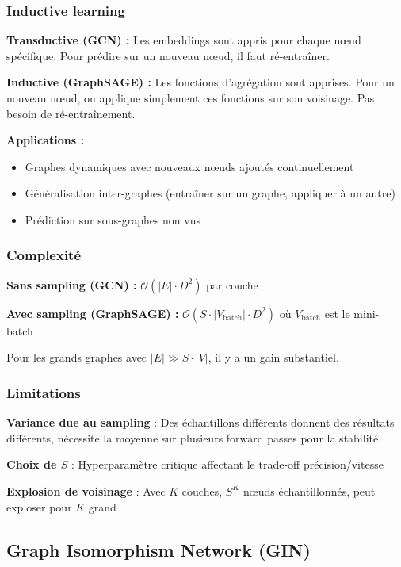 \subsubsection{Inductive learning}

\textbf{Transductive (GCN) :}
Les embeddings sont appris pour chaque nœud spécifique. Pour prédire sur un nouveau nœud, il faut ré-entraîner.

\textbf{Inductive (GraphSAGE) :}
Les fonctions d'agrégation sont apprises. Pour un nouveau nœud, on applique simplement ces fonctions sur son voisinage. Pas besoin de ré-entraînement.

\textbf{Applications :}
\begin{itemize}
    \item Graphes dynamiques avec nouveaux nœuds ajoutés continuellement
    \item Généralisation inter-graphes (entraîner sur un graphe, appliquer à un autre)
    \item Prédiction sur sous-graphes non vus
\end{itemize}

\subsubsection{Complexité}

\textbf{Sans sampling (GCN) :} $\mathcal{O}(|E| \cdot D^2)$ par couche

\textbf{Avec sampling (GraphSAGE) :} $\mathcal{O}(S \cdot |V_{\text{batch}}| \cdot D^2)$ où $V_{\text{batch}}$ est le mini-batch

Pour les grands graphes avec $|E| \gg S \cdot |V|$, il y a un gain substantiel.

\subsubsection{Limitations}

\textbf{Variance due au sampling} : Des échantillons différents donnent des résultats différents, nécessite la moyenne sur plusieurs forward passes pour la stabilité

\textbf{Choix de $S$} : Hyperparamètre critique affectant le trade-off précision/vitesse

\textbf{Explosion de voisinage} : Avec $K$ couches, $S^K$ nœuds échantillonnés, peut exploser pour $K$ grand

\subsection{Graph Isomorphism Network (GIN)}

